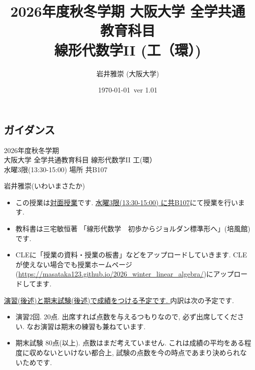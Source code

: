 \documentclass[dvipdfmx,a4paper,11pt]{article} %
\title{2026年度秋冬学期 大阪大学 全学共通教育科目 \\ 線形代数学II (工（環）)}
\author{岩井雅崇 (大阪大学)}
\date{\today \, ver 1.01}
\theoremstyle{definition}
\begin{document}
\maketitle
\setcounter{tocdepth}{2}
\tableofcontents
\newpage

\begin{center}
\setcounter{section}{-1}
\section{ガイダンス}
\label{sec-guide}
\end{center}

\begin{center}
{\Large 2026年度秋冬学期 \\ 大阪大学 全学共通教育科目 線形代数学II 工(環）} \\
水曜3限(13:30-15:00) 場所 共B107
 \end{center}
\begin{flushright}
 岩井雅崇(いわいまさたか) \\
\end{flushright}

\begin{itemize}
  \setlength{\parskip}{0cm} %
  \setlength{\itemsep}{0cm} %
\item この授業は\underline{対面授業}です. \underline{水曜3限(13:30-15:00) に共B107}にて授業を行います.
\item 教科書は三宅敏恒著 「線形代数学　初歩からジョルダン標準形へ」(培風館)です. 
\item CLEに「授業の資料・授業の板書」などをアップロードしていきます. CLEが使えない場合でも授業ホームページ(\url{https://masataka123.github.io/2026_winter_linear_algebra/})にアップロードしてます.
\end{itemize}


\underline{演習(後述)と期末試験(後述)で成績をつける予定です. } 内訳は次の予定です.

\begin{itemize}
\item 演習2回. 20点. 出席すれば点数を与えるつもりなので, 必ず出席してください. なお演習は期末の練習も兼ねています.
\item 期末試験 80点(以上). 点数はまだ考えていません. これは成績の平均をある程度に収めないといけない都合上, 試験の点数を今の時点であまり決められないためです.
\end{itemize}
\end{document}
